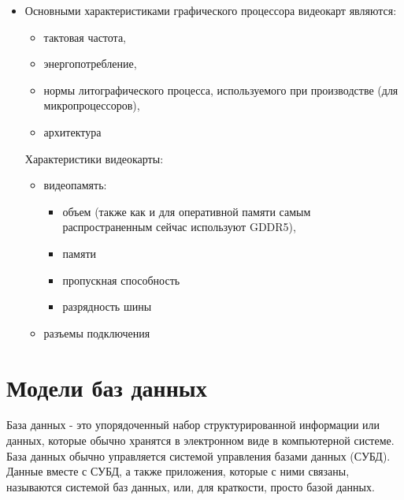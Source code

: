 \begin{itemize}
\begin{itemize}
            \item
               Основными характеристиками графического процессора видеокарт являются: 
               \begin{itemize}
                   \item 
                       тактовая частота, 
                   \item 
                       энергопотребление, 
                   \item 
                       нормы литографического процесса, используемого при производстве (для микропроцессоров), 
                   \item 
                       архитектура
               \end{itemize}
               Характеристики видеокарты:
               \begin{itemize}
                   \item 
                       видеопамять:
                       \begin{itemize}
                           \item 
                               объем (также как и для оперативной памяти самым распространенным сейчас используют GDDR5),
                           \item 
                               памяти
                           \item 
                               пропускная способность
                           \item
                               разрядность шины
                       \end{itemize}
                   \item 
                       разъемы подключения
               \end{itemize}
        \end{itemize}
    \end{itemize}


\section{Модели баз данных}

База данных - это упорядоченный набор структурированной информации или данных, которые обычно хранятся в электронном виде в компьютерной системе. База данных обычно управляется системой управления базами данных (СУБД). Данные вместе с СУБД, а также приложения, которые с ними связаны, называются системой баз данных, или, для краткости, просто базой данных.

